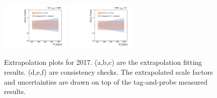 \begin{figure}[!htbp]
  \includegraphics[width=0.3\textwidth]{fig/Extrapolate_2017_1_Compare.pdf}
  \includegraphics[width=0.3\textwidth]{fig/Extrapolate_2017_2_Compare.pdf}
  \caption{Extrapolation plots for 2017. (a,b,c) are the extrapolation fitting results. (d,e,f) are consistency checks. The extrapolated scale factors and uncertainties are drawn on top of the tag-and-probe measured results.}
  \label{fig:Extrapolation2017}
\end{figure}

